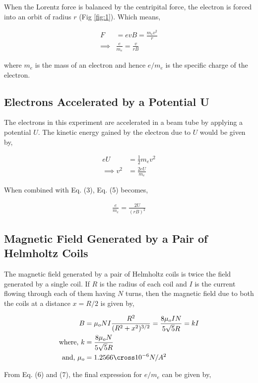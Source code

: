 When the Lorentz force is balanced by the centripital force, the electron is forced into an orbit of radius $r$ (Fig \ref{fig:1}). Which means,

\begin{align}
    F &= evB = \frac{m_ev^2}{r} \\
    \implies &\frac{e}{m_e} = \frac{v}{rB}
\end{align}

where $m_e$ is the mass of an electron and hence $e/m_e$ is the specific charge of the electron.

\subsection{Electrons Accelerated by a Potential U}
The electrons in this experiment are accelerated in a beam tube by applying a potential $U$. The kinetic energy gained by the electron due to $U$ would be given by,

\begin{align}
        eU &= \frac{1}{2}m_ev^2\\
        \implies v^2 &= \frac{2eU}{m_e}
\end{align}

When combined with Eq. (3), Eq. (5) becomes,

\begin{align}
    \frac{e}{m_e} = \frac{2U}{(rB)^2}
\end{align}

\subsection{Magnetic Field Generated by a Pair of Helmholtz Coils}
The magnetic field generated by a pair of Helmholtz coils is twice the field generated by a single coil. If $R$ is the radius of each coil and $I$ is the current flowing through each of them having $N$ turns, then the magnetic field due to both the coils at a distance $x = R/2$ is given by,

\begin{align}
    B &= \mu_oNI\frac{R^2}{(R^2+x^2)^{3/2}} = \frac{8\mu_oIN}{5\sqrt{5}R} = kI\\
    \text{where, } k &= \frac{8\mu_oN}{5\sqrt{5}R} \nonumber\\
    \text{ and, } \mu_o &= 1.2566\cross 10^{-6} N/A^2 \nonumber
\end{align}

From Eq. (6) and (7), the final expression for $e/m_e$ can be given by,

